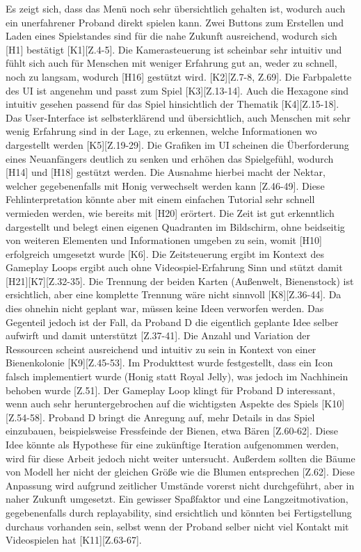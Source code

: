 Es zeigt sich, dass das Menü noch sehr übersichtlich gehalten ist, wodurch auch ein unerfahrener Proband direkt spielen kann. Zwei Buttons zum Erstellen und Laden eines Spielstandes sind für die nahe Zukunft ausreichend, wodurch sich [H1] bestätigt [K1][Z.4-5]. Die Kamerasteuerung ist scheinbar sehr intuitiv und fühlt sich auch für Menschen mit weniger Erfahrung gut an, weder zu schnell, noch zu langsam, wodurch [H16] gestützt wird. [K2][Z.7-8, Z.69]. Die Farbpalette des UI ist angenehm und passt zum Spiel [K3][Z.13-14]. Auch die Hexagone sind intuitiv gesehen passend für das Spiel hinsichtlich der Thematik [K4][Z.15-18]. Das User-Interface ist selbsterklärend und übersichtlich, auch Menschen mit sehr wenig Erfahrung sind in der Lage, zu erkennen, welche Informationen wo dargestellt werden [K5][Z.19-29].  Die Grafiken im UI scheinen die Überforderung eines Neuanfängers deutlich zu senken und erhöhen das Spielgefühl, wodurch [H14] und [H18] gestützt werden. Die Ausnahme hierbei macht der Nektar, welcher gegebenenfalls mit Honig verwechselt werden kann [Z.46-49]. Diese Fehlinterpretation könnte aber mit einem einfachen Tutorial sehr schnell vermieden werden, wie bereits mit [H20] erörtert. Die Zeit ist gut erkenntlich dargestellt und belegt einen eigenen Quadranten im Bildschirm, ohne beidseitig von weiteren Elementen und Informationen umgeben zu sein, womit [H10] erfolgreich umgesetzt wurde [K6]. Die Zeitsteuerung ergibt im Kontext des Gameplay Loops ergibt auch ohne Videospiel-Erfahrung Sinn und stützt damit [H21][K7][Z.32-35]. Die Trennung der beiden Karten (Außenwelt, Bienenstock) ist ersichtlich, aber eine komplette Trennung wäre nicht sinnvoll [K8][Z.36-44]. Da dies ohnehin nicht geplant war, müssen keine Ideen verworfen werden. Das Gegenteil jedoch ist der Fall, da Proband D die eigentlich geplante Idee selber aufwirft und damit unterstützt [Z.37-41]. Die Anzahl und Variation der Ressourcen scheint ausreichend und intuitiv zu sein in Kontext von einer Bienenkolonie [K9][Z.45-53]. Im Produkttest wurde festgestellt, dass ein Icon falsch implementiert wurde (Honig statt Royal Jelly), was jedoch im Nachhinein behoben wurde [Z.51]. Der Gameplay Loop klingt für Proband D interessant, wenn auch sehr heruntergebrochen auf die wichtigsten Aspekte des Spiels [K10][Z.54-58]. Proband D bringt die Anregung auf, mehr Details in das Spiel einzubauen, beispielsweise Fressfeinde der Bienen, etwa Bären [Z.60-62]. Diese Idee könnte als Hypothese für eine zukünftige Iteration aufgenommen werden, wird für diese Arbeit jedoch nicht weiter untersucht. Außerdem sollten die Bäume von Modell her nicht der gleichen Größe wie die Blumen entsprechen [Z.62]. Diese Anpassung wird aufgrund zeitlicher Umstände vorerst nicht durchgeführt, aber in naher Zukunft umgesetzt. Ein gewisser Spaßfaktor und eine Langzeitmotivation, gegebenenfalls durch replayability, sind ersichtlich und könnten bei Fertigstellung durchaus vorhanden sein, selbst wenn der Proband selber nicht viel Kontakt mit Videospielen hat [K11][Z.63-67].

